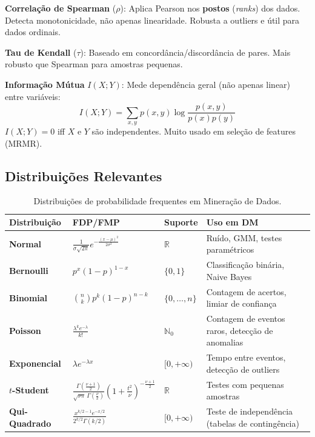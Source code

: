 \documentclass[12pt,a4paper]{article}
\begin{document}
\textbf{Correlação de Spearman} ($\rho$): Aplica Pearson nos \textbf{postos} (\textit{ranks}) dos dados. Detecta monotonicidade, não apenas linearidade. Robusta a outliers e útil para dados ordinais.

\textbf{Tau de Kendall} ($\tau$): Baseado em concordância/discordância de pares. Mais robusto que Spearman para amostras pequenas.

\textbf{Informação Mútua} $I(X;Y)$: Mede dependência geral (não apenas linear) entre variáveis:
\[
  I(X; Y) = \sum_{x,y} p(x,y) \log \frac{p(x,y)}{p(x) p(y)}
\]
$I(X;Y) = 0$ iff $X$ e $Y$ são independentes. Muito usado em seleção de features (MRMR).

\subsection{Distribuições Relevantes}

\begin{table}[h!]
\centering
\caption{Distribuições de probabilidade frequentes em Mineração de Dados.}
\renewcommand{\arraystretch}{1.5}
\begin{tabular}{>{\bfseries}p{2.5cm} p{4cm} p{1.5cm} p{4.5cm}}
\toprule
Distribuição & FDP/FMP & Suporte & Uso em DM \\
\midrule
Normal & $\frac{1}{\sigma\sqrt{2\pi}} e^{-\frac{(x-\mu)^2}{2\sigma^2}}$ & $\mathbb{R}$ & Ruído, GMM, testes paramétricos \\
Bernoulli & $p^x (1-p)^{1-x}$ & $\{0,1\}$ & Classificação binária, Naive Bayes \\
Binomial & $\binom{n}{k} p^k (1-p)^{n-k}$ & $\{0,\ldots,n\}$ & Contagem de acertos, limiar de confiança \\
Poisson & $\frac{\lambda^k e^{-\lambda}}{k!}$ & $\mathbb{N}_0$ & Contagem de eventos raros, detecção de anomalias \\
Exponencial & $\lambda e^{-\lambda x}$ & $[0,+\infty)$ & Tempo entre eventos, detecção de outliers \\
$t$-Student & $\frac{\Gamma(\frac{\nu+1}{2})}{\sqrt{\nu\pi}\,\Gamma(\frac{\nu}{2})}\left(1+\frac{t^2}{\nu}\right)^{-\frac{\nu+1}{2}}$ & $\mathbb{R}$ & Testes com pequenas amostras \\
Qui-Quadrado & $\frac{x^{k/2-1}e^{-x/2}}{2^{k/2}\Gamma(k/2)}$ & $[0,+\infty)$ & Teste de independência (tabelas de contingência) \\
\bottomrule
\end{tabular}
\end{table}
\end{document}
